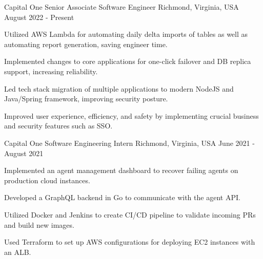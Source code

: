
\begin{cventries}

  \cventry
  {Capital One} %
  {Senior Associate Software Engineer} %
  {Richmond, Virginia, USA} %
  {August 2022 - Present} %
  {
    \begin{cvitems} %
      \item {Utilized AWS Lambda for automating daily delta imports of tables as well as automating report generation, saving engineer time.}
      \item {Implemented changes to core applications for one-click failover and DB replica support, increasing reliability.}
      \item {Led tech stack migration of multiple applications to modern NodeJS and Java/Spring framework, improving security posture.}
      \item {Improved user experience, efficiency, and safety by implementing crucial business and security features such as SSO.}
    \end{cvitems}
  }


  \cventry
  {Capital One} %
  {Software Engineering Intern} %
  {Richmond, Virginia, USA} %
  {June 2021 - August 2021} %
  {
    \begin{cvitems} %
      \item {Implemented an agent management dashboard to recover failing agents on production cloud instances.}
      \item {Developed a GraphQL backend in Go to communicate with the agent API.}
      \item {Utilized Docker and Jenkins to create CI/CD pipeline to validate incoming PRs and build new images.}
      \item {Used Terraform to set up AWS configurations for deploying EC2 instances with an ALB.}
    \end{cvitems}
  }


\end{cventries}

